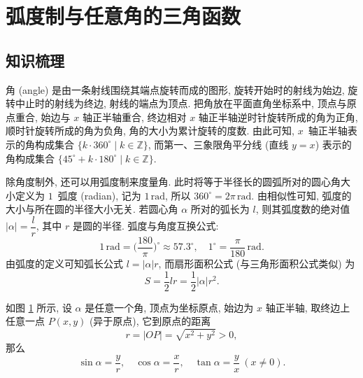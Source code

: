\section{弧度制与任意角的三角函数}

\subsection{知识梳理}
角 (angle) 是由一条射线围绕其端点旋转而成的图形, 旋转开始时的射线为始边, 
旋转中止时的射线为终边, 射线的端点为顶点. 
把角放在平面直角坐标系中, 顶点与原点重合, 始边与 $x$ 轴正半轴重合, 
终边相对 $x$ 轴正半轴逆时针旋转所成的角为正角, 顺时针旋转所成的角为负角, 
角的大小为累计旋转的度数. 由此可知, $x$~轴正半轴表示的角构成集合 
$\{k\cdot360^\circ\mid k\in\mathbb{Z}\}$,  
而第一、三象限角平分线 (直线 $y=x$) 表示的角构成集合
$\{45^\circ+k\cdot180^\circ\mid k\in\mathbb{Z}\}$.

除角度制外, 还可以用弧度制来度量角. 此时将等于半径长的圆弧所对的圆心角大小定义为 $1$~弧度 (radian), 记为 $1\,\mathrm{rad}$,
所以 $360^\circ =2\pi\,\mathrm{rad}$. 由相似性可知, 弧度的大小与所在圆的半径大小无关. 若圆心角 $\alpha$ 所对的弧长为 $l$, 
则其弧度数的绝对值 $|\alpha|=\dfrac{l}{r}$, 其中 $r$ 是圆的半径.
弧度与角度互换公式: 
\[1\,\mathrm{rad}= \Big(\frac{180}{\pi}\Big)^{\circ} \approx 57.3^{\circ}, \quad
    1^{\circ}= \frac{\pi}{180}\,\mathrm{rad}.\]
由弧度的定义可知弧长公式 $l=|\alpha|r$, 而扇形面积公式 (与三角形面积公式类似) 为
\[S= \dfrac{1}{2}lr= \dfrac{1}{2}|\alpha| r^2.\]

如图 \ref{fig-190421-1130} 所示, 设 $\alpha$ 是任意一个角, 顶点为坐标原点, 始边为 $x$ 轴正半轴, 取终边上任意一点 $P(x, y)$ (异于原点), 它到原点的距离 
\[r=|OP|= \sqrt{x^2+ y^2}> 0,\]
那么 
\[\sin\alpha= \frac{y}{r},\quad
    \cos\alpha= \frac{x}{r},\quad 
    \tan\alpha= \frac{y}{x}\ (x\neq 0).\]

\begin{figure}[hb]
    \centering\small
    \caption{}\label{fig-190421-1130}
\end{figure}

